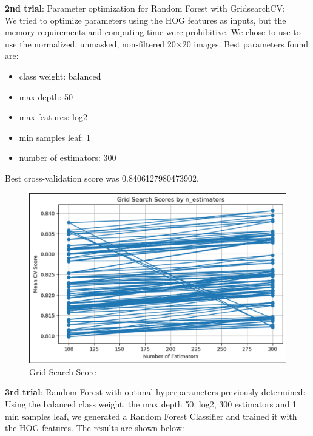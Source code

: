\documentclass{article}
\begin{document}
\textbf{2nd trial}: Parameter optimization for Random Forest with GridsearchCV:\\
We tried to optimize parameters using the HOG features as inputs, but the memory requirements and computing time were prohibitive. We chose to use to use the normalized, unmasked, non-filtered 20×20 images. 
Best parameters found are:
\begin{itemize}
    \item class weight: balanced
    \item max depth: 50
    \item max features: log2
    \item min samples leaf: 1
    \item number of estimators: 300
\end{itemize} 
Best cross-validation score was  0.8406127980473902.

\begin{figure}[H]
    \centering
    \includegraphics[width=0.8\linewidth]{GridSearchScore.png}
    \caption{Grid Search Score}
    \label{fig:GridSearchCV}
\end{figure}

\textbf{3rd trial}: Random Forest with optimal hyperparameters previously determined:\\
Using the balanced class weight, the max depth 50, log2, 300 estimators and 1 min samples leaf, we generated a Random Forest Classifier and trained it with the HOG features. The results are shown below: 
\end{document}
